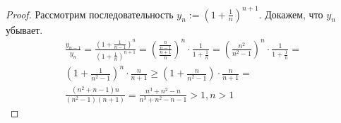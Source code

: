 \begin{proof}
	Рассмотрим последовательность $y_n := (1 + \frac{1}{n})^{n + 1}$. Докажем, что $y_n$ убывает.
	\begin{multline*}
		\frac{y_{n - 1}}{y_n} = \frac{(1 + \frac{1}{n - 1})^n}{(1 + \frac{1}{n})^{n + 1}} = \left(\frac{\frac{n}{n - 1}}{\frac{n + 1}{n}}\right)^n \cdot \frac{1}{1 + \frac{1}{n}} = \left(\frac{n^2}{n^2 - 1}\right)^n \cdot \frac{1}{1 + \frac{1}{n}} = \\
		\left(1 + \frac{1}{n^2 - 1}\right)^n \cdot \frac{n}{n + 1} \ge \left(1 + \frac{n}{n^2 - 1}\right) \cdot \frac{n}{n + 1} = \\
		\frac{(n^2 + n - 1)n}{(n^2 - 1)(n + 1)} = \frac{n^3 + n^2 - n}{n^3 + n^2 - n - 1} > 1, n > 1
	\end{multline*}
\end{proof}